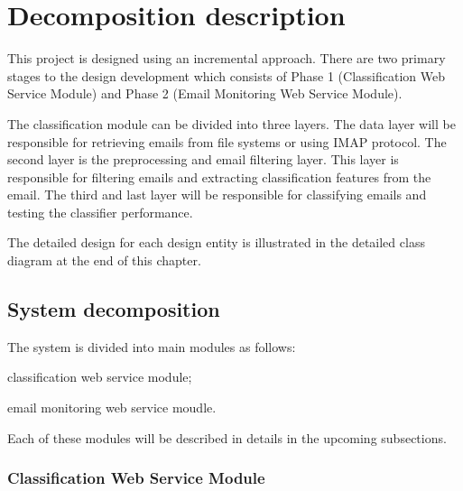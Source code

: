 \section{Decomposition description}
This project is designed using an incremental approach. There are two
primary  stages to the design development which consists of Phase 1 
(Classification Web Service Module) and Phase 2 (Email Monitoring Web Service Module).

The classification module can be divided into three layers. The data layer will be 
responsible for retrieving emails from file systems or using IMAP protocol. The 
second layer is the preprocessing and email filtering layer. This layer is 
responsible for filtering emails and extracting classification features from the 
email. The third and last layer will be responsible for classifying emails and 
testing the classifier performance.

The detailed design for each design entity is illustrated in the detailed class 
diagram at the end of this chapter.

\subsection{System decomposition}
The system is divided into main modules as follows:
\begin{my_itemize}
\item classification web service module;
\item email monitoring web service moudle.
\end{my_itemize}
Each of these modules will be described in details in the upcoming subsections.

\subsubsection{Classification Web Service Module}

